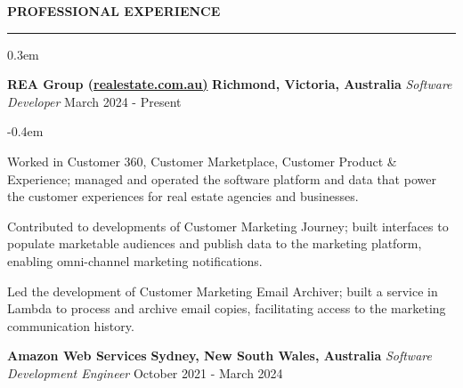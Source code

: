 \documentclass{cv}
\begin{document}

\sectionskip


\textbf{\uppercase{Professional Experience}}
\sectionlineskip
\hrule height 0.1em
\begin{list}{}{\setlength{\leftmargin}{0em}}
\itemsep 0.3em
\item
    \textbf{REA Group (\href{https://realestate.com.au/}{realestate.com.au)}} \hfill \textbf{Richmond, Victoria, Australia}%
    \vspace{0.1em} \newline 
    {\textit{Software Developer}} \hfill {March 2024 - Present}%
    \begin{list}{\raisebox{0.2em}{\tiny$\bullet$} \hspace{0em}}{\setlength{\leftmargin}{2.0em}}
        \itemsep -0.4em \vspace{-0.4em}
        \item Worked in Customer 360, Customer Marketplace, Customer Product \& Experience; managed and operated the software platform and data that power the customer experiences for real estate agencies and businesses.
        \item Contributed to developments of Customer Marketing Journey; built interfaces to populate marketable audiences and publish data to the marketing platform, enabling omni-channel marketing notifications.
        \item Led the development of Customer Marketing Email Archiver; built a service in Lambda to process and archive email copies, facilitating access to the marketing communication history.
    \end{list}
\item 
    \textbf{Amazon Web Services} \hfill \textbf{Sydney, New South Wales, Australia}%
    \vspace{0.1em} \newline 
    {\textit{Software Development Engineer}} \hfill {October 2021 - March 2024}%
    \begin{list}{\raisebox{0.2em}{\tiny$\bullet$} \hspace{0em}}{\setlength{\leftmargin}{2.0em}}

\end{list}
\end{list}
\end{document}
